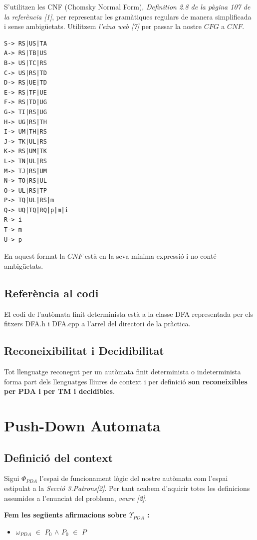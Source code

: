 \documentclass[12pt,a4paper]{report}
\def \wpda{$\omega_{PDA} $}
\def \contextPDA{$\Phi_{PDA}$}
\def \prePDA{$\Upsilon_{PDA}$}
\begin{document}
S’utilitzen les CNF (Chomsky Normal Form), \textit{Definition 2.8 de la pàgina 107 de la referència [1]}, per representar les gramàtiques regulars de manera simplificada i sense ambigüetats. Utilitzem \textit{l’eina web [7]} per passar la nostre $CFG$ a $CNF$. 

\begin{lstlisting}
S-> RS|US|TA
A-> RS|TB|US
B-> US|TC|RS
C-> US|RS|TD
D-> RS|UE|TD
E-> RS|TF|UE
F-> RS|TD|UG
G-> TI|RS|UG
H-> UG|RS|TH
I-> UM|TH|RS
J-> TK|UL|RS
K-> RS|UM|TK
L-> TN|UL|RS
M-> TJ|RS|UM
N-> TO|RS|UL
O-> UL|RS|TP
P-> TQ|UL|RS|m
Q-> UQ|TQ|RQ|p|m|i
R-> i
T-> m
U-> p

\end{lstlisting}

En aquest format la $CNF$ està en la seva mínima expressió i no conté ambigüetats.

\section{Referència al codi}

El codi de l'autòmata finit determinista està a la classe DFA representada per els fitxers DFA.h i DFA.cpp a l'arrel del directori de la pràctica.

\section{Reconeixibilitat i Decidibilitat}

Tot llenguatge reconegut per un autòmata finit determinista o indeterminista forma part dels llenguatges lliures de context i per definició \textbf{son reconeixibles per PDA i per TM i decidibles}.

\clearpage

\chapter{Push-Down Automata}

\section{Definició del context}

Sigui \contextPDA{} l'espai de funcionament lògic del nostre autòmata com l'espai estipulat a la \textit{Secció 3.Patrons[2]}. Per tant acabem d'aquirir totes les definicions assumides a l'enunciat del problema, \textit{veure [2]}.

\textbf{Fem les següents afirmacions sobre \prePDA{} :}
\begin{itemize}
\item \wpda{} $\in$ $P_0$ $\wedge$ $P_0$ $\in$ $P$
\end{itemize}
\end{document}

